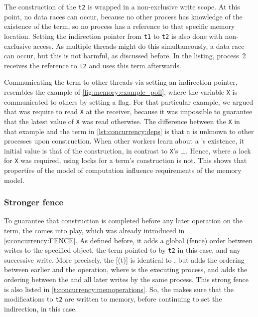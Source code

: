 The construction of the \lterm \lstinline|t2| is wrapped in a non-exclusive write scope.
At this point, no data races can occur, because no other process has knowledge of the existence of the term, so no process has a reference to that specific memory location.
Setting the indirection pointer from \lstinline|t1| to \lstinline|t2| is also done with non-exclusive access.
As multiple threads might do this simultaneously, a data race can occur, but this is not harmful, as discussed before.
In the listing, process~2 receives the reference to \lstinline|t2| and uses this term afterwards.

Communicating the term to other threads via setting an indirection pointer, resembles the example of \vref{fig:memory:example_poll}, where the variable \lstinline|X| is communicated to others by setting a flag.
For that particular example, we argued that  was require to read \lstinline|X| at the receiver, because it was impossible to guarantee that the latest value of \lstinline|X| was read otherwise.
The difference between the \lstinline|X| in that example and the term in \cref{lst:concurrency:deps} is that a \lterm is unknown to other processes upon construction.
When other workers learn about a \lterm's existence, it initial value is that of the construction, in contrast to \lstinline|X|'s $\bot$.
Hence, where a lock for \lstinline|X| was required, using locks for a term's construction is not.
This shows that properties of the model of computation influence requirements of the memory model.

\subsubsection{Stronger fence}

To guarantee that construction is completed before any later operation on the term, the  comes into play, which was already introduced in \cref{s:concurrency:FENCE}.
As defined before, it adds a global (fence) order between writes to the specified object, the term pointed to by \lstinline|t2| in this case, and any successive write.
More precisely, the [(t)] is identical to , but adds the ordering \SYMorderprog* between earlier  and the  operation, where \SYMproc is the executing process, and adds the ordering \SYMorderfence between the  and all later writes by the same process.
This strong fence is also listed in \vref{t:concurrency:memoperations}.
So, the  makes sure that the modifications to \lstinline|t2| are written to memory, before continuing to set the indirection, in this case.

